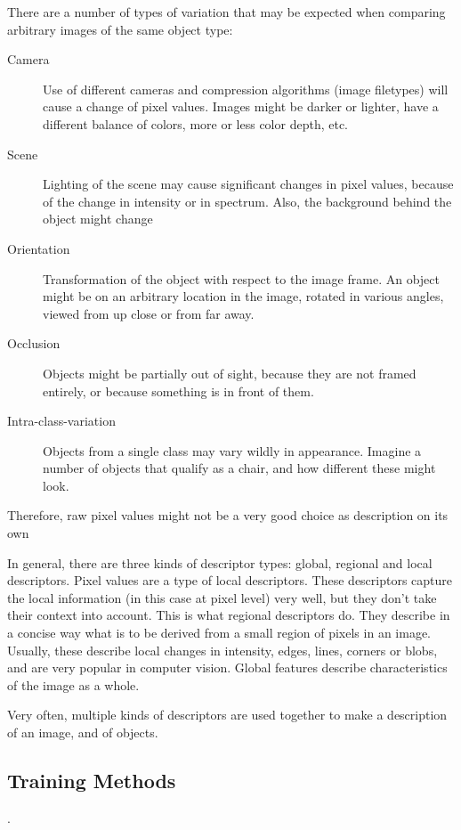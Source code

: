 There are a number of types of variation that may be expected when comparing arbitrary images of the same object type:
\begin{description}
    \item[Camera] Use of different cameras and compression algorithms (image filetypes) will cause a change of pixel values. Images might be darker or lighter, have a different balance of colors, more or less color depth, etc.
    \item[Scene] Lighting of the scene may cause significant changes in pixel values, because of the change in intensity or in spectrum. Also, the background behind the object might change
    \item[Orientation] Transformation of the object with respect to the image frame. An object might be on an arbitrary location in the image, rotated in various angles, viewed from up close or from far away.
    \item[Occlusion] Objects might be partially out of sight, because they are not framed entirely, or because something is in front of them.
    \item[Intra-class-variation] Objects from a single class may vary wildly in appearance. Imagine a number of objects that qualify as a chair, and how different these might look.
\end{description}
Therefore, raw pixel values might not be a very good choice as description on its own

In general, there are three kinds of descriptor types: global, regional and local descriptors. Pixel values are a type of local descriptors. These descriptors capture the local information (in this case at pixel level) very well, but they don't take their context into account. This is what regional descriptors do. They describe in a concise way what is to be derived from a small region of pixels in an image. Usually, these describe local changes in intensity, edges, lines, corners or blobs, and are very popular in computer vision. Global features describe characteristics of the image as a whole. 

Very often, multiple kinds of descriptors are used together to make a description of an image, and of objects.


\subsection{Training Methods} %
\label{sub:training_methods}
.


